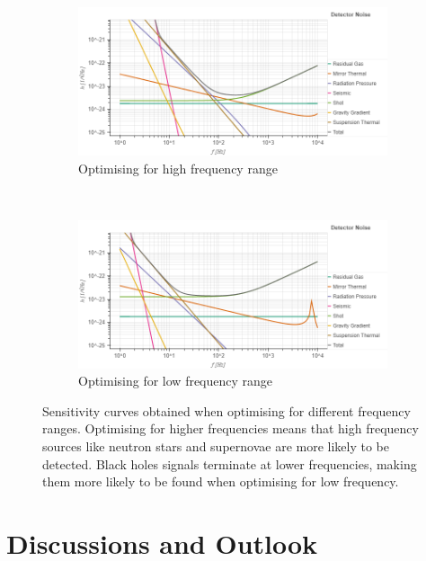 \documentclass{article}
\begin{document}
    \begin{figure}[h!]
\centering
\begin{subfigure}{.8\textwidth}
        \centering
\includegraphics[width=1\linewidth, trim = {0 0 0 1cm}, clip]{HighFreq.png}
         \caption{Optimising for high frequency range}
         \end{subfigure}%
         \\
        \begin{subfigure}{.8\textwidth}
        \centering
        \includegraphics[width=1\linewidth, trim = {0 0 0 0.9cm}, clip]
{LowFreq.png}
         \caption{Optimising for low frequency range}
         \end{subfigure}
         \caption{Sensitivity curves obtained when optimising for different frequency ranges. Optimising for higher frequencies means that high frequency sources like neutron stars and supernovae are more likely to be detected. Black holes signals terminate at lower frequencies, making them more likely to be found when optimising for low frequency.}
         \label{fig::LowHighFreq}
 \end{figure}

\clearpage
\section{Discussions and Outlook}
\end{document}
